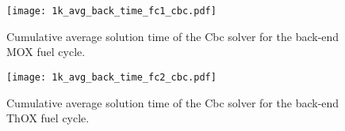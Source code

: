 \begin{figure}[h!]
  \begin{center}
    \texttt{[image: 1k\_avg\_back\_time\_fc1\_cbc.pdf]}
    \caption[]{
      \label{fig:1k_avg_back_time_fc1_cbc}
      Cumulative average solution time of the Cbc solver for the back-end MOX
      fuel cycle.}
  \end{center}
\end{figure}

\begin{figure}[h!]
  \begin{center}
    \texttt{[image: 1k\_avg\_back\_time\_fc2\_cbc.pdf]}
    \caption[]{
      \label{fig:1k_avg_back_time_fc2_cbc}
      Cumulative average solution time of the Cbc solver for the back-end ThOX
      fuel cycle.}
  \end{center}
\end{figure}





